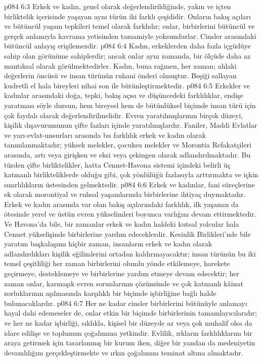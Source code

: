 \vs p084 6:3 Erkek ve kadın, genel olarak değerlendirildiğinde, yakın ve içten birliktelik içerisinde yaşayan aynı türün iki farklı çeşididir. Onların bakış açıları ve bütüncül yaşam tepkileri temel olarak farklıdır; onlar, birbirlerini bütüncül ve gerçek anlamıyla kavrama yetisinden tamamiyle yoksundurlar. Cinsler arasındaki bütüncül anlayış erişilemezdir.
\vs p084 6:4 Kadın, erkeklerden daha fazla içgüdüye sahip olan görünüme sahiplerdir; ancak onlar aynı zamanda, bir ölçüde daha az mantıksal olarak görülmektedirler. Kadın, buna rağmen, her zaman; ahlaki değerlerin öncüsü ve insan türünün ruhani önderi olmuştur. Beşiği sallayan kudretli el hala bireyleri nihai son ile bütünleştirmektedir.
\vs p084 6:5 Erkekler ve kadınlar arasındaki doğa, tepki, bakış açısı ve düşüncedeki farklılıklar, endişe yaratması söyle dursun, hem bireysel hem de bütünlüksel biçimde insan türü için çok faydalı olarak değerlendirilmelidir. Evren yaratılmışlarının birçok düzeyi, kişilik dışavurumunun çifte fazları içinde yaratılmışlardır. Faniler, Maddi Evlatlar ve yarı\hyp{}evlat\hyp{}unsurları arasında bu farklılık erkek ve kadın olarak tanımlanmaktadır; yüksek melekler, çocuksu melekler ve Morontia Refakatçileri arasında, artı veya girişken ve eksi veya çekingen olarak adlandırılmaktadır. Bu türden çifte birliktelikler, hatta Cennet\hyp{}Havona sistemi içindeki belirli üç katmanlı birlikteliklerde olduğu gibi, çok yönlülüğü fazlasıyla arttırmakta ve içkin sınırlılıkların üstesinden gelmektedir.
\vs p084 6:6 Erkek ve kadınlar, fani süreçlerine ek olarak morontiyal ve ruhsal yaşamlarında birbirlerine ihtiyaç duymaktadır. Erkek ve kadın arasında var olan bakış açılarındaki farklılık, ilk yaşamın da ötesinde yerel ve üstün evren yükselimleri boyunca varlığını devam ettirmektedir. Ve Havona’da bile, bir zamanlar erkek ve kadın haldeki kutsal yolcular hala Cennet yükselişinde birbirlerine yardım edeceklerdir. Kesinlik Birlikleri’nde bile yaratım başkalaşımı hiçbir zaman, insanların erkek ve kadın olarak adlandırdıkları kişilik eğilimlerini ortadan kaldırmayacaktır; insan türünün bu iki temel çeşitliliği her zaman birbirlerini olumlu yönde etkilemeye, harekete geçirmeye, desteklemeye ve birbirlerine yardım etmeye devam edecektir; her zaman onlar, karmaşık evren sorunlarının çözümünde ve çok katmanlı kâinat zorluklarının aşılmasında karşılıklı bir biçimde işbirliğine bağlı halde bulunacaklardır.
\vs p084 6:7 Her ne kadar cinsler birbirlerini bütünüyle anlamayı hayal dahi edemeseler de, onlar etkin bir biçimde birbirlerinin tamamlayıcılarıdır; ve her ne kadar işbirliği, sıklıkla, kişisel bir düzeyde az veya çok muhalif olsa da idare edilişe ve toplumun çoğalımına yetkindir. Evlilik, ırkların farklılıklarını bir araya getirmek için tasarlanmış bir kurum iken, diğer bir yandan da medeniyetin devamlılığını gerçekleştirmekte ve ırkın çoğalımını teminat altına almaktadır.
